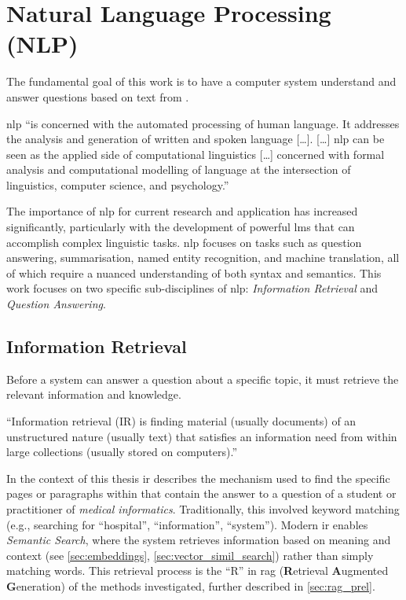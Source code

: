 \section{Natural Language Processing (NLP)}\label{sec:nlp_prel}
The fundamental goal of this work is to have a computer system understand and answer questions based on text from \citet{bb2}.
\begin{definition}
    \ac{nlp} \enquote{is concerned with the automated processing of human language. It addresses the analysis and generation of written and spoken language [\dots].
    [\dots] \ac{nlp} can be seen as the applied side of computational linguistics [\dots] concerned with formal analysis and computational modelling of language at the intersection of linguistics, computer science, and psychology.} \citep[p.1]{meurer2021nlp}
\end{definition}
The importance of \ac{nlp} for current research and application has increased significantly, particularly with the development of powerful \acp{lm} that can accomplish complex linguistic tasks.
\ac{nlp} focuses on tasks such as question answering, summarisation, named entity recognition, and machine translation, all of which require a nuanced understanding of both syntax and semantics.
This work focuses on two specific sub-disciplines of \ac{nlp}:
\textit{Information Retrieval} and \textit{Question Answering}.
%
\subsection{Information Retrieval}\label{subsec:ir}
Before a system can answer a question about a specific topic, it must retrieve the relevant information and knowledge.
%
\begin{definition}\label{def:ir}
\enquote{Information retrieval (IR) is finding material (usually documents) of
an unstructured nature (usually text) that satisfies an information need
from within large collections (usually stored on computers).} \citep[p.1]{ManningRaghavanSchuetze2008ir}
\end{definition}
%
In the context of this thesis \ac{ir} describes the mechanism used to find the specific pages or paragraphs within \citet{bb2} that contain the answer to a question of a student or practitioner of \textit{medical informatics}.
Traditionally, this involved keyword matching (e.g., searching for \enquote{hospital}, \enquote{information}, \enquote{system}).
Modern \ac{ir} enables \textit{Semantic Search}, where the system retrieves information based on meaning and context (see \cref{sec:embeddings}, \cref{sec:vector_simil_search}) rather than simply matching words.
This retrieval process is the \enquote{R} in \ac{rag} (\textbf{R}etrieval \textbf{A}ugmented \textbf{G}eneration) of the methods investigated, further described in \cref{sec:rag_prel}.
%
